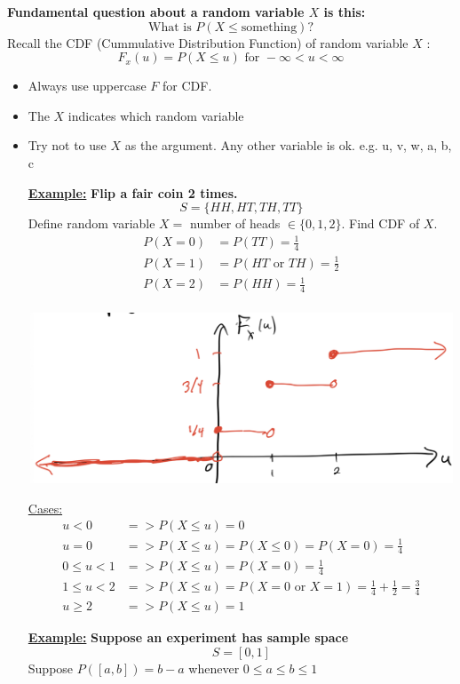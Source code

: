 \documentclass[10pt]{article}
\begin{document}
\begin{flushleft}
\textbf{Fundamental question about a random variable $X$ is this:}
$$ \text{What is } P(X \leq \text{something}) ?$$
Recall the CDF (Cummulative Distribution Function) of random variable $X$ :
$$ F_x(u) = P(X \leq u) \text{ for } -\infty < u < \infty$$
\begin{itemize}
    \item Always use uppercase $F$ for CDF.
    \item The $X$ indicates which random variable
    \item Try not to use $X$ as the argument. Any other variable is ok. e.g. u,
        v, w, a, b, c
\end{itemize}

\begin{itemize}
    \item[\textbf{\underline{Example:}}] \textbf{Flip a fair coin 2 times.}
        $$ S = \{HH, HT, TH, TT\} $$
        Define random variable $X = $ number of heads $\in \{0, 1, 2\}$. Find
        CDF of $X$.
        $$ \begin{aligned}
            P(X = 0) &= P(TT) = \frac{1}{4} \\
            P(X = 1) &= P(HT \text{ or } TH) = \frac{1}{2} \\
            P(X = 2) &= P(HH) = \frac{1}{4} \\
        \end{aligned} $$

        \begin{center}
            \includegraphics[width=6in, height=2in]{Week_4.1}
        \end{center}

        \underline{Cases:}
        $$ \begin{aligned}
            u < 0 &=> P(X \leq u) = 0 \\
            u = 0 &=> P(X \leq u) = P(X \leq 0) = P(X = 0) = \frac{1}{4} \\
            0 \leq u < 1 &=> P(X \leq u) = P(X = 0) = \frac{1}{4} \\
            1 \leq u < 2 &=> P(X \leq u) = P(X = 0 \text{ or } X = 1) =
            \frac{1}{4} + \frac{1}{2} = \frac{3}{4} \\
            u \geq 2 &=> P(X \leq u) = 1
        \end{aligned} $$
    \item[\textbf{\underline{Example:}}] \textbf{Suppose an experiment has
        sample space}
        $$ S = [0, 1] $$
        Suppose $P([a,b]) = b - a$ whenever $0 \leq a \leq b \leq 1$


\end{itemize}
\end{flushleft}
\end{document}
